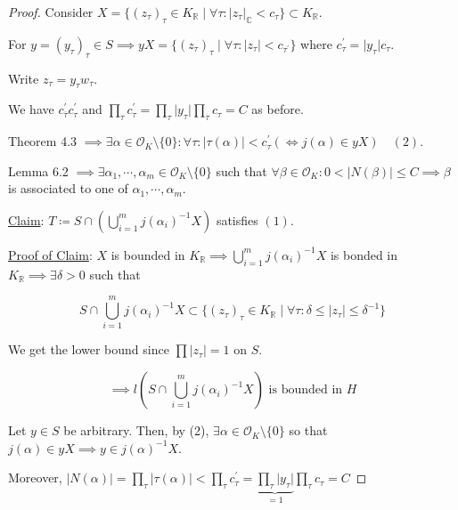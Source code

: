 \documentclass[openany]{amsbook}
\numberwithin{section}{chapter}
\theoremstyle{definition}
\begin{document}
\begin{proof}
    Consider \(X = \{ (z_{\tau})_{\tau} \in K_\mathbb{R} \mid \forall \tau  : \vert z_{\tau}  \vert _\mathbb{C} < c_{\tau}  \} \subset K_\mathbb{R} \).
    
    For \(y = (y_{\tau})_{\tau} \in S \implies y X = \{ (z_{\tau})_{\tau} \mid \forall \tau : \vert z_{\tau} \vert < c_{\tau ^{\prime}} \}  \) where \(\boxed{c_{\tau} ^{\prime}  = \vert y_{\tau}  \vert c_{\tau}}\).

    Write \(z_{\tau} = y_{\tau} w_{\tau}\).

    We have \(c^{\prime}_{\overline{\tau }}  c^{\prime}_{\tau}\) and \(\prod_{\tau} c_{\tau} ^{\prime} = \prod_{\tau} \vert y_{\tau} \vert \prod_{\tau} c_{\tau} = C \) as before.
    
    Theorem 4.3 \(\implies \exists \alpha \in \mathcal{O}_K \setminus \{ 0 \} : \forall \tau : \vert \tau (\alpha) \vert < c_{\tau}^{\prime} (\iff j(\alpha) \in y X) \quad (2)\).
    
    Lemma 6.2 \(\implies \exists \alpha_1, \cdots , \alpha_m \in \mathcal{O}_K \setminus \{ 0 \}\) such that \(\forall \beta \in \mathcal{O}_K : 0 < \vert N(\beta) \vert \leq C \implies \beta\) is associated to one of \(\alpha_1, \cdots , \alpha_m\).

    \underline{Claim}: \(T\coloneqq S \cap  \left( \bigcup_{i=1}^{m} j(\alpha_i)^{-1} X \right) \) satisfies \((1)\).

    \underline{Proof of Claim}: \(X\) is bounded in \(K_\mathbb{R} \implies \bigcup_{i=1}^{m} j(\alpha_i)^{-1} X\) is bonded in \(K_\mathbb{R} \implies \exists \delta > 0\) such that

    \[
        S \cap \bigcup_{i=1}^{m} j (\alpha_i) ^{-1} X \subset \{ (z_{\tau})_{\tau} \in K_\mathbb{R} \mid \forall \tau : \delta \leq \vert z_{\tau} \vert \leq \delta ^{-1}    \} 
    \]

    We get the lower bound since \(\prod \vert z_{\tau} \vert = 1\) on \(S\).

    \[
        \implies l \left( S \cap \bigcup_{i=1}^{m} j (\alpha _i)^{-1} X \right) \text{ is bounded in } H
    \]

    Let \(y\in S\) be arbitrary. Then, by (2), \(\exists \alpha \in \mathcal{O}_K \setminus \{ 0 \} \) so that \(j(\alpha) \in yX \implies y\in j(\alpha)^{-1} X\).
    
    Moreover, \(\vert N(\alpha) \vert = \prod_{\tau} \vert \tau(\alpha) \vert < \prod_{\tau} c_{\tau} ^{\prime} = \underbrace{\prod_{\tau} \vert y_{\tau}  \vert }_{=1} \prod_{\tau} c_\tau = C \) 


\end{proof}
\end{document}
